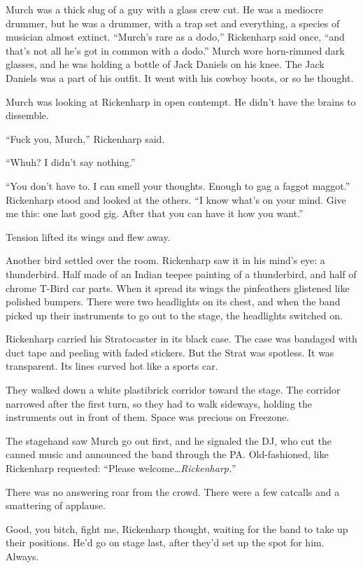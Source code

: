Murch was a thick slug of a guy with a glass crew cut. He was a mediocre drummer, but he was a drummer, with a trap set and everything, a species of musician almost extinct. ``Murch's rare as a dodo,'' Rickenharp said once, ``and that's not all he's got in common with a dodo.'' Murch wore horn-rimmed dark glasses, and he was holding a bottle of Jack Daniels on his knee. The Jack Daniels was a part of his outfit. It went with his cowboy boots, or so he thought.

Murch was looking at Rickenharp in open contempt. He didn't have the brains to dissemble.

``Fuck you, Murch,'' Rickenharp said.

``Whuh? I didn't say nothing.''

``You don't have to. I can smell your thoughts. Enough to gag a faggot maggot.'' Rickenharp stood and looked at the others. ``I know what's on your mind. Give me this: one last good gig. After that you can have it how you want.''

Tension lifted its wings and flew away.

Another bird settled over the room. Rickenharp saw it in his mind's eye: a thunderbird. Half made of an Indian teepee painting of a thunderbird, and half of chrome T-Bird car parts. When it spread its wings the pinfeathers glistened like polished bumpers. There were two headlights on its chest, and when the band picked up their instruments to go out to the stage, the headlights switched on.

Rickenharp carried his Stratocaster in its black case. The case was bandaged with duct tape and peeling with faded stickers. But the Strat was spotless. It was transparent. Its lines curved hot like a sports car.

They walked down a white plastibrick corridor toward the stage. The corridor narrowed after the first turn, so they had to walk sideways, holding the instruments out in front of them. Space was precious on Freezone.

The stagehand saw Murch go out first, and he signaled the DJ, who cut the canned music and announced the band through the PA. Old-fashioned, like Rickenharp requested: ``Please welcome\ldots \textit{Rickenharp.}''

There was no answering roar from the crowd. There were a few catcalls and a smattering of applause.

Good, you bitch, fight me, Rickenharp thought, waiting for the band to take up their positions. He'd go on stage last, after they'd set up the spot for him. Always.

